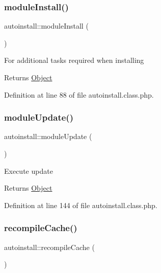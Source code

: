 \subsubsection{\texorpdfstring{module\+Install()}{moduleInstall()}}
{\footnotesize\ttfamily autoinstall\+::module\+Install (\begin{DoxyParamCaption}{ }\end{DoxyParamCaption})}

For additional tasks required when installing

\begin{DoxyReturn}{Returns}
\hyperlink{classObject}{Object} 
\end{DoxyReturn}


Definition at line 88 of file autoinstall.\+class.\+php.

\mbox{\label{classautoinstall_a856f1e61cac8e20ed0df58a6a10f61a8}} 
\subsubsection{\texorpdfstring{module\+Update()}{moduleUpdate()}}
{\footnotesize\ttfamily autoinstall\+::module\+Update (\begin{DoxyParamCaption}{ }\end{DoxyParamCaption})}

Execute update

\begin{DoxyReturn}{Returns}
\hyperlink{classObject}{Object} 
\end{DoxyReturn}


Definition at line 144 of file autoinstall.\+class.\+php.

\mbox{\label{classautoinstall_a7455962a1f07ea4c4e28971fa8dde715}} 
\subsubsection{\texorpdfstring{recompile\+Cache()}{recompileCache()}}
{\footnotesize\ttfamily autoinstall\+::recompile\+Cache (\begin{DoxyParamCaption}{ }\end{DoxyParamCaption})}

